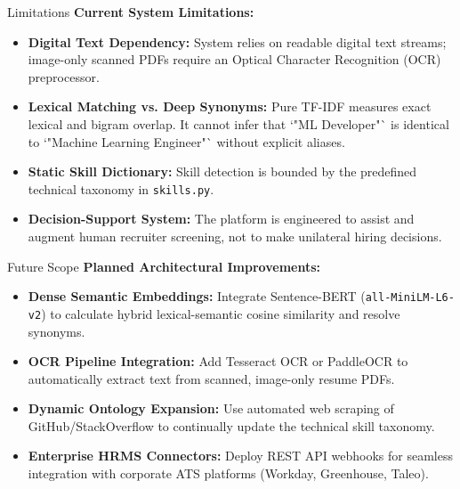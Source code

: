 \documentclass[aspectratio=169, 10pt]{beamer}
\begin{document}
\begin{frame}{Limitations}
  \textbf{Current System Limitations:}
  \begin{itemize}
    \item \textbf{Digital Text Dependency:} System relies on readable digital text streams; image-only scanned PDFs require an Optical Character Recognition (OCR) preprocessor.
    \item \textbf{Lexical Matching vs. Deep Synonyms:} Pure TF-IDF measures exact lexical and bigram overlap. It cannot infer that `"ML Developer"` is identical to `"Machine Learning Engineer"` without explicit aliases.
    \item \textbf{Static Skill Dictionary:} Skill detection is bounded by the predefined technical taxonomy in \texttt{skills.py}.
    \item \textbf{Decision-Support System:} The platform is engineered to assist and augment human recruiter screening, not to make unilateral hiring decisions.
  \end{itemize}
\end{frame}

\begin{frame}{Future Scope}
  \textbf{Planned Architectural Improvements:}
  \begin{itemize}
    \item \textbf{Dense Semantic Embeddings:} Integrate Sentence-BERT (\texttt{all-MiniLM-L6-v2}) to calculate hybrid lexical-semantic cosine similarity and resolve synonyms.
    \item \textbf{OCR Pipeline Integration:} Add Tesseract OCR or PaddleOCR to automatically extract text from scanned, image-only resume PDFs.
    \item \textbf{Dynamic Ontology Expansion:} Use automated web scraping of GitHub/StackOverflow to continually update the technical skill taxonomy.
    \item \textbf{Enterprise HRMS Connectors:} Deploy REST API webhooks for seamless integration with corporate ATS platforms (Workday, Greenhouse, Taleo).
  \end{itemize}
\end{frame}
\end{document}
